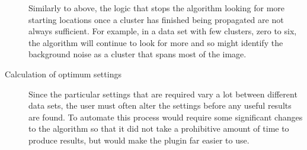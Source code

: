 \begin{description}
		Similarly to above, the logic that stops the algorithm looking for
		more starting locations once a cluster has finished being propagated
		are not always sufficient. For example, in a data set with few
		clusters, zero to six, the algorithm will continue to look for more and
		so might identify the background noise as a cluster that spans most of
		the image.

	\item[Calculation of optimum settings] \hfill

		Since the particular settings that are required vary a lot between
		different data sets, the user must often alter the settings before any
		useful results are found. To automate this process would require some
		significant changes to the algorithm so that it did not take a
		prohibitive amount of time to produce results, but would make the
		plugin far easier to use.

\end{description}
